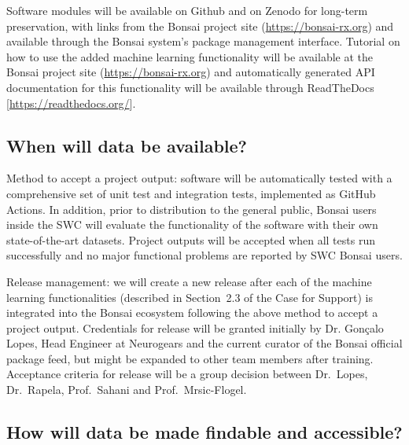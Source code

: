 \documentclass[a4paper,11pt]{article}
\renewcommand{\footnote}[1]{ [#1]}
\begin{document}
Software modules will be available on Github and on Zenodo for long-term
preservation, with links from the Bonsai project site
(\url{https://bonsai-rx.org}) and available through the Bonsai system's package
management interface. Tutorial on how to use the added machine learning
functionality will be available at the Bonsai project site
(\url{https://bonsai-rx.org}) and automatically generated API documentation for
this functionality will be available through
ReadTheDocs\footnote{\url{https://readthedocs.org/}}.

\subsection{When will data be available?}


Method to accept a project output: software will be automatically tested with a
comprehensive set of unit test and integration tests, implemented as  GitHub
Actions. In addition, prior to distribution to the general public, Bonsai users
inside the SWC will evaluate the functionality of the software with their own
state-of-the-art datasets. Project outputs will be accepted when all tests run
successfully and no major functional problems are reported by SWC Bonsai users.

Release management: we will create a new release after each of the machine
learning functionalities (described in Section~2.3 of the Case for Support) is
integrated into the Bonsai ecosystem following the above method to accept a
project output. Credentials for release will be granted initially by Dr.
Gonçalo Lopes, Head Engineer at Neurogears and the current curator of the
Bonsai official package feed, but might be expanded to other team members after
training.  Acceptance criteria for release will be a group decision between
Dr.~Lopes, Dr.~Rapela, Prof.~Sahani and Prof.~Mrsic-Flogel.

\subsection{How will data be made findable and accessible?}
\end{document}
